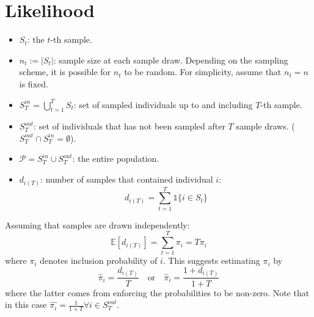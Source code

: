 \documentclass[a4paper, 12pt]{article}
\begin{document}
\section{Likelihood}
\begin{itemize}
    \item $S_t$: the $t$-th sample.
    \item $n_t := |S_t|$: sample size at each sample draw. Depending on the sampling scheme, it is possible for $n_t$ to be random. For simplicity, assume that $n_t = n$ is fixed.
    \item $S_T^{in} = \bigcup \limits_{t=1}^{T} S_t$: set of sampled individuals up to and including $T$-th sample.
    \item $S_T^{out}$: set of individuals that has not been sampled after $T$ sample draws. ($S_T^{out} \cap S_T^{in} = \emptyset$).
    \item $\mathcal{P} = S_T^{in} \cup S_T^{out}$: the entire population.
    \item $d_{i(T)}$: number of samples that contained individual $i$:
    \begin{equation*}
        d_{i(T)} = \sum_{t=1}^T \mathds{1}\{i \in S_t \}
    \end{equation*}
\end{itemize}
Assuming that samples are drawn independently:
\begin{equation*}
    \mathbb{E}[d_{i(T)}] = \sum_{t = 1}^T \pi_i = T\pi_i
\end{equation*}
where $\pi_i$ denotes inclusion probability of $i$. This suggests estimating $\pi_i$ by
\begin{equation} \label{eq:1}
    \hat{\pi}_i = \frac{d_{i(T)}}{T} \quad \text{or} \quad \hat{\pi}_i = \frac{1 + d_{i(T)}}{1 + T}
\end{equation}
where the latter comes from enforcing the probabilities to be non-zero. Note that in this case $\hat{\pi_i} = \frac{1}{1 + T} \forall i \in S_T^{out}$.
\end{document}
